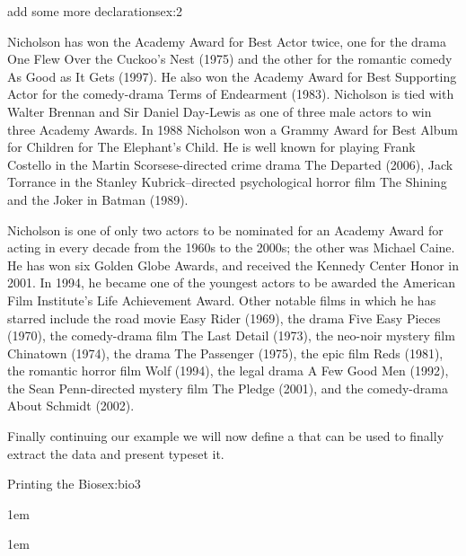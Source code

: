 \begin{texexample}{add some more declarations}{ex:2}
{Nicholson has won the Academy Award for Best Actor twice, one for the drama One Flew Over the Cuckoo's Nest (1975) and the other for the romantic comedy As Good as It Gets (1997). He also won the Academy Award for Best Supporting Actor for the comedy-drama Terms of Endearment (1983). Nicholson is tied with Walter Brennan and Sir Daniel Day-Lewis as one of three male actors to win three Academy Awards. In 1988 Nicholson won a Grammy Award for Best Album for Children for The Elephant's Child. He is well known for playing Frank Costello in the Martin Scorsese-directed crime drama The Departed (2006), Jack Torrance in the Stanley Kubrick–directed psychological horror film The Shining and the Joker in Batman (1989).

Nicholson is one of only two actors to be nominated for an Academy Award for acting in every decade from the 1960s to the 2000s; the other was Michael Caine. He has won six Golden Globe Awards, and received the Kennedy Center Honor in 2001. In 1994, he became one of the youngest actors to be awarded the American Film Institute's Life Achievement Award. Other notable films in which he has starred include the road movie Easy Rider (1969), the drama Five Easy Pieces (1970), the comedy-drama film The Last Detail (1973), the neo-noir mystery film Chinatown (1974), the drama The Passenger (1975), the epic film Reds (1981), the romantic horror film Wolf (1994), the legal drama A Few Good Men (1992), the Sean Penn-directed mystery film The Pledge (2001), and the comedy-drama About Schmidt (2002).
}
\end{texexample}

Finally continuing our example we will now define a  that can be used
to finally extract the data and present typeset it.

  
\begin{texexample}{Printing the Bios}{ex:bio3}
\long\gdef\PrintBio#1{%
\par
 {\pagebreak
 \leavevmode 
 \Huge
 \bfseries
 \centerline{\GetFullName {#1}}}
 \par
 \vspace{20pt}

 {\centering
  \GetPhoto {#1}\par
  \vspace{20pt}}

 \parindent1em
 \GetBio {#1}
 \vfill
}

\PrintBio{Robert}

\PrintBio{Jack}
\end{texexample}

